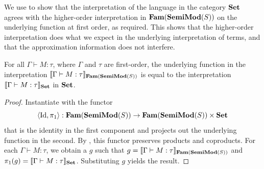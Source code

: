 We use  to show that the
interpretation of the language in the category $\mathbf{Set}$ agrees with the
higher-order interpretation in $\mathbf{Fam}(\mathbf{SemiMod}(S))$
on the underlying function at first order, as required. This shows that the
higher-order interpretation does what we expect in the underlying
interpretation of terms, and that the approximation information does
not interfere.

\begin{theorem}
  \label{thm:underlying-interp-equal} For all
  $\Gamma \vdash M : \tau$, where $\Gamma$ and $\tau$ are first-order,
  the underlying function in the interpretation
  $\llbracket \Gamma \vdash M : \tau \rrbracket_{\mathbf{Fam}(\mathbf{SemiMod}(S))}$ is equal to the
  interpretation $\llbracket \Gamma \vdash M : \tau \rrbracket_{\mathbf{Set}}$ in $\mathbf{Set}$.
\end{theorem}

\begin{proof}
  Instantiate  with the functor
  \begin{displaymath}
    \langle \mathrm{Id} , \pi_1 \rangle : \mathbf{Fam}(\mathbf{SemiMod}(S)) \to \mathbf{Fam}(\mathbf{SemiMod}(S)) \times \mathbf{Set}
  \end{displaymath}
  that is the identity in the first component and projects out the
  underlying function in the second. By
  , this functor
  preserves products and coproducts. For each
  $\Gamma \vdash M : \tau$, we obtain a $g$ such that
  $g = \llbracket \Gamma \vdash M : \tau \rrbracket_{\mathbf{Fam}(\mathbf{SemiMod}(S))}$ and
  $\pi_1(g) = \llbracket \Gamma \vdash M : \tau \rrbracket_{\mathbf{Set}}$. Substituting $g$
  yields the result.
\end{proof}

